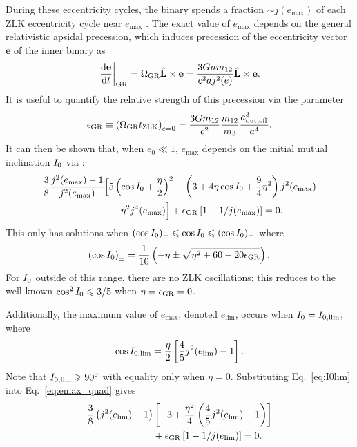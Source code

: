 \documentclass[
        fleqn,
        usenatbib,
    ]{mnras}
\newcommand*{\rd}[2]{\frac{\mathrm{d}#1}{\mathrm{d}#2}}
\newcommand*{\at}[1]{\left.#1\right|}
\newcommand*{\p}[1]{\left(#1\right)}
\newcommand*{\s}[1]{\left[#1\right]}
\newcommand*{\bm}[1]{\mathbf{#1}}
\newcommand*{\uv}[1]{\hat{\mathbf{#1}}}
\begin{document}
During these eccentricity cycles, the binary spends a fraction $\sim
j(e_{\max})$ of each ZLK eccentricity cycle near $e_{\max}$
\citep{anderson2016formation}. The exact value of $e_{\max}$ depends on the
general relativistic apsidal precession, which induces precession of the
eccentricity vector $\bm{e}$ of the inner binary as
\begin{equation}
    \at{\rd{\bm{e}}{t}}_{\rm GR} = \Omega_{\rm GR}\uv{L} \times \bm{e}
        = \frac{3Gnm_{12}}{c^2aj^2(e)}\uv{L} \times \bm{e}.
\end{equation}
It is useful to quantify the relative strength of this precession via the
parameter
\begin{equation}
    \epsilon_{\rm GR} \equiv \p{\Omega_{\rm GR} t_{\rm ZLK}}_{e = 0}
        = \frac{3Gm_{12}}{c^2} \frac{m_{12}}{m_3}\frac{a_{\rm out, eff}^3}{a^4}.
\end{equation}
It can then be shown that, when $e_0 \ll 1$, $e_{\max}$ depends on the initial
mutual inclination $I_{\rm 0}$ via \citep{LML15, anderson2016formation}:
\begin{align}
    \frac{3}{8}\frac{j^2(e_{\max}) - 1}{j^2(e_{\max})}\Big[&
        5\p{\cos I_0 + \frac{\eta}{2}}^2
        - \p{3 + 4\eta \cos I_0 + \frac{9}{4}\eta^2}j^2(e_{\max})
            \nonumber\\
        &+ \eta^2 j^4(e_{\max})
    \Big] + \epsilon_{\rm GR}\s{1 - 1 / j(e_{\max})} = 0.\label{eq:emax_quad}
\end{align}
This only has solutions when $(\cos I_{\rm 0})_- \leq \cos I_{\rm 0} \leq (\cos
I_{\rm 0})_+$ where \citep{anderson2016formation}
\begin{equation}
    \p{\cos I_{\rm 0}}_{\pm} = \frac{1}{10}\p{-\eta \pm \sqrt{\eta^2 + 60 -
        20\epsilon_{\rm GR}}}.\label{eq:I0bounds}
\end{equation}
For $I_{\rm 0}$ outside of this range, there are no ZLK oscillations; this
reduces to the well-known $\cos^2 I_{\rm 0} \leq 3/5$ when $\eta = \epsilon_{\rm
GR} = 0$.

Additionally, the maximum value of $e_{\max}$, denoted $e_{\lim}$, occurs when
$I_{\rm 0} = I_{\rm 0, \lim}$, where
\begin{equation}
    \cos I_{\rm 0, \lim} = \frac{\eta}{2}\s{\frac{4}{5}j^2(e_{\lim}) -
        1}.\label{eq:I0lim}
\end{equation}
Note that $I_{\rm 0, \lim} \geq 90^\circ$ with equality only when $\eta
= 0$. Substituting Eq.~\eqref{eq:I0lim} into Eq.~\eqref{eq:emax_quad}
gives
\begin{align}
    \frac{3}{8}\p{j^2(e_{\lim}) - 1}&\s{-3 + \frac{\eta^2}{4}
        \p{\frac{4}{5}j^2(e_{\lim}) - 1}}\nonumber\\
        &+ \epsilon_{\rm GR}\s{1 - 1 / j(e_{\lim})} = 0.
        \label{eq:def_elim}
\end{align}
\end{document}
